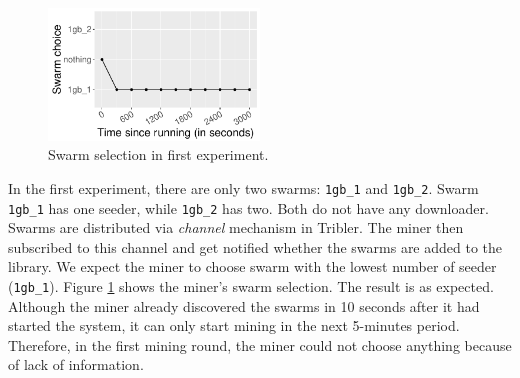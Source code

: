 \begin{figure}[h]
	\centering
	\includegraphics[width=0.5\textwidth]{pics/results/val0.pdf}
	\caption{Swarm selection in first experiment.}
	\label{fig:val0}
\end{figure}

In the first experiment, there are only two swarms: \texttt{1gb\_1} and \texttt{1gb\_2}. Swarm \texttt{1gb\_1} has one seeder, while \texttt{1gb\_2} has two. Both do not have any downloader. Swarms are distributed via \textit{channel} mechanism in Tribler. The miner then subscribed to this channel and get notified whether the swarms are added to the library. We expect the miner to choose swarm with the lowest number of seeder (\texttt{1gb\_1}). Figure \ref{fig:val0} shows the miner's swarm selection. The result is as expected. Although the miner already discovered the swarms in 10 seconds after it had started the system, it can only start mining in the next 5-minutes period. Therefore, in the first mining round, the miner could not choose anything because of lack of information.

